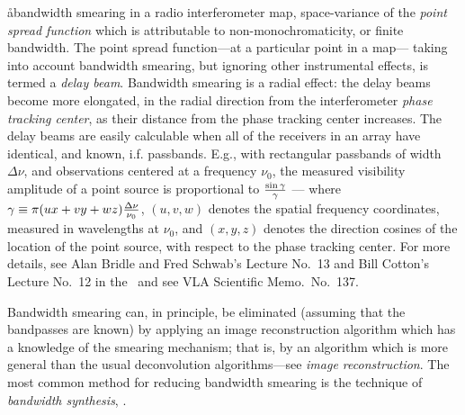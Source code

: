 \aa{bandwidth smearing}
in a radio interferometer map, space-variance of the {\it point spread
function} which is attributable to non-monochromaticity, or finite bandwidth.
The point spread function---at a particular point in a map---%
taking into account bandwidth smearing, but
ignoring other instrumental effects, is termed a {\it delay beam}.
Bandwidth smearing is a radial effect: the delay beams become more
elongated, in the radial direction from the interferometer {\it phase tracking
center}, as their distance from the phase tracking center increases.
The delay beams are easily calculable when all of the receivers
in an array have identical, and known, i.f. passbands.
E.g., with rectangular passbands of width $\Delta\nu$, and observations
centered at a frequency $\nu_0$,
the measured visibility amplitude of a point source
is proportional to $\sin\gamma\over\gamma$ ---%
where $\gamma\equiv\pi(ux+vy+wz){\Delta\nu\over\nu_0}$,
$(u,v,w)$ denotes the spatial frequency coordinates, measured in wavelengths
at $\nu_0$, and $(x,y,z)$ denotes the direction cosines of the location of the
point source, with respect to the phase tracking center.
For more details, see Alan Bridle and Fred Schwab's Lecture No.~13
and Bill Cotton's Lecture No.~12 in the \sira\ and
see VLA Scientific Memo.\ No.~137.
\par
Bandwidth smearing can, in principle, be eliminated
(assuming that the bandpasses are known) by applying an
image reconstruction algorithm which has a knowledge of the smearing
mechanism; that is, by an algorithm which is more general than the usual
deconvolution algorithms---see {\it image reconstruction}.
The most common method for reducing bandwidth smearing
is the technique of {\it bandwidth synthesis}, \qv.

